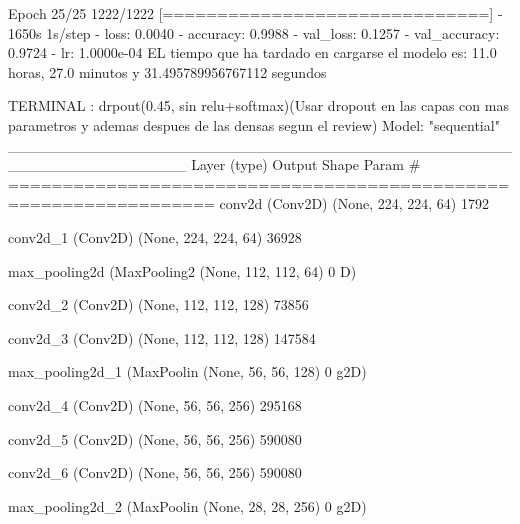 \documentclass[11pt, a4paper]{article} %
\begin{document}
Epoch 25/25
1222/1222 [==============================] - 1650s 1s/step - loss: 0.0040 - accuracy: 0.9988 - val_loss: 0.1257 - val_accuracy: 0.9724 - lr: 1.0000e-04
EL tiempo que ha tardado en cargarse el modelo es: 11.0 horas, 27.0 minutos y 31.495789956767112 segundos



TERMINAL : drpout(0.45, sin relu+softmax)(Usar dropout en las capas con mas parametros y ademas despues de las densas segun el review)
Model: "sequential"
_________________________________________________________________
 Layer (type)                Output Shape              Param #   
=================================================================
 conv2d (Conv2D)             (None, 224, 224, 64)      1792      
                                                                 
 conv2d_1 (Conv2D)           (None, 224, 224, 64)      36928     
                                                                 
 max_pooling2d (MaxPooling2  (None, 112, 112, 64)      0         
 D)                                                              
                                                                 
 conv2d_2 (Conv2D)           (None, 112, 112, 128)     73856     
                                                                 
 conv2d_3 (Conv2D)           (None, 112, 112, 128)     147584    
                                                                 
 max_pooling2d_1 (MaxPoolin  (None, 56, 56, 128)       0         
 g2D)                                                            
                                                                 
 conv2d_4 (Conv2D)           (None, 56, 56, 256)       295168    
                                                                 
 conv2d_5 (Conv2D)           (None, 56, 56, 256)       590080    
                                                                 
 conv2d_6 (Conv2D)           (None, 56, 56, 256)       590080    
                                                                 
 max_pooling2d_2 (MaxPoolin  (None, 28, 28, 256)       0         
 g2D)                                                            
                                                                 
\end{document}
